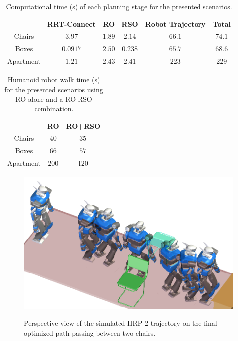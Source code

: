 \begin{table}
\label{tab:chap1-computation-time}
\centering
\begin{tabular}{c|c|c|c|c|c|}
  \cline{2-6}
  & RRT-Connect & RO & RSO & Robot Trajectory & Total\\
  \hline
  \multicolumn{1}{|c|}{Chairs} & $3.97$ & $1.89$ & $2.14$ & $66.1$ & $74.1$\\
  \hline
  \multicolumn{1}{|c|}{Boxes} & $0.0917$ & $2.50$ & $0.238$ & $65.7$ & $68.6$\\
  \hline
  \multicolumn{1}{|c|}{Apartment} & $1.21$ & $2.43$ & $2.41$ & $223$ & $229$ \\
  \hline
\end{tabular}
\caption{Computational time (s) of each planning stage for the
  presented scenarios.}
\end{table}

\begin{table}
\label{tab:chap1-walk-time}
\centering
\begin{tabular}{c|c|c|}
  \cline{2-3}
  & RO & RO+RSO \\
  \hline
  \multicolumn{1}{|c|}{Chairs} & $40$ & $35$ \\
  \hline
  \multicolumn{1}{|c|}{Boxes} & $66$ & $57$ \\
  \hline
  \multicolumn{1}{|c|}{Apartment} & $200$ & $120$ \\
  \hline
\end{tabular}
\caption{Humanoid robot walk time (s) for the presented scenarios
  using RO alone and a RO-RSO combination.}
\end{table}

\begin{figure}
  \centering
      {\includegraphics[width = \linewidth]
        {src/chap1-path-optimization/chairs-hash-optim-perspective-hrp2.png}}
      \caption{Perspective view of the simulated HRP-2 trajectory on
        the final optimized path passing between two chairs.}
      \label{fig:chap1-chairs-hash-optim-perspective-hrp2}
\end{figure}

